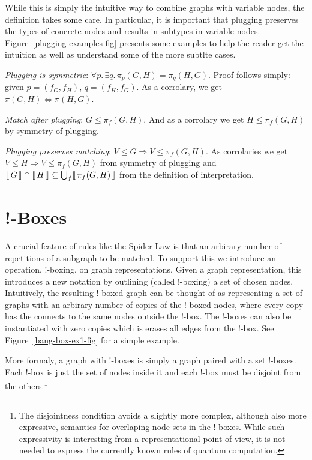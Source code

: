 \documentclass[runningheads]{llncs}
\newcommand{\vinterp}[1]{\lfloor\hspace{-0.27em}|\, #1\, |\hspace{-0.27em}\rfloor}
\begin{document}
While this is simply the intuitive way to combine graphs with variable
nodes, the definition takes some care. In particular, it is important
that plugging preserves the types of concrete nodes and results in
subtypes in variable nodes. Figure~\ref{plugging-examples-fig}
presents some examples to help the reader get the intuition as well as
understand some of the more subtlte cases.

\begin{theorem}
  \emph{Plugging is symmetric}: $\forall p.\, \exists q.\, \pi_p(G,H)
  = \pi_q(H,G)$. Proof follows simply: given $p = (f_G,f_H)$, $q =
  (f_H,f_G)$. As a corrolary, we get $\pi(G,H) \Leftrightarrow
  \pi(H,G)$.
\end{theorem}

\begin{theorem}
  \emph{Match after plugging}: $G \leq \pi_f(G,H)$. And as a corrolary
  we get $H \leq \pi_f(G,H)$ by symmetry of plugging. 
\end{theorem}

\begin{theorem}
  \emph{Plugging preserves matching}: $V \leq G \Rightarrow V \leq
  \pi_f(G,H)$. As corrolaries we get $V \leq H \Rightarrow V \leq
  \pi_f(G,H)$ from symmetry of plugging and $\vinterp{G} \cap
  \vinterp{H} \subseteq \bigcup_f \vinterp{\pi_f(G,H)}$ from the
  definition of interpretation. 
\end{theorem}




\section{!-Boxes}

A crucial feature of rules like the Spider Law is that an arbirary
number of repetitions of a subgraph to be matched. To support this we
introduce an operation, !-boxing, on graph representations. Given a
graph representation, this introduces a new notation by outlining
(called !-boxing) a set of chosen nodes. Intuitively, the resulting
!-boxed graph can be thought of as representing a set of graphs with
an arbirary number of copies of the !-boxed nodes, where every copy
has the connects to the same nodes outside the !-box. The !-boxes can
also be instantiated with zero copies which is erases all edges from
the !-box. See Figure~\ref{bang-box-ex1-fig} for a simple example.

More formaly, a graph with !-boxes is simply a graph paired with a set
!-boxes. Each !-box is just the set of nodes inside it and each !-box
must be disjoint from the others.\footnote{The disjointness condition
  avoids a slightly more complex, although also more expressive,
  semantics for overlaping node sets in the !-boxes. While such
  expressivity is interesting from a representational point of view,
  it is not needed to express the currently known rules of quantum
  computation.}
\end{document}
